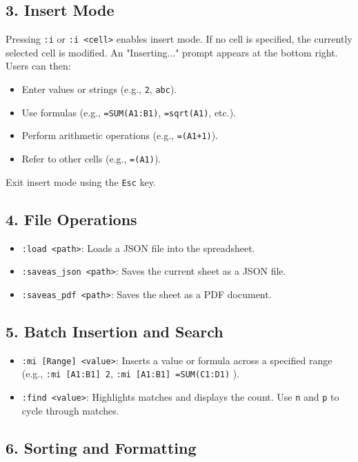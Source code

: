 \documentclass[a4paper,12pt]{article}
\begin{document}
\subsection*{3. Insert Mode}

Pressing \texttt{:i} or \texttt{:i <cell>} enables insert mode. If no cell is specified, the currently selected cell is modified. An "Inserting..." prompt appears at the bottom right. Users can then:
\begin{itemize}[label={}]
  \item Enter values or strings (e.g., \texttt{2}, \texttt{abc}).
  \item Use formulas (e.g., \texttt{=SUM(A1:B1)}, \texttt{=sqrt(A1)}, etc.).
  \item Perform arithmetic operations (e.g., \texttt{=(A1+1)}).
  \item Refer to other cells (e.g., \texttt{=(A1)}).
\end{itemize}
Exit insert mode using the \texttt{Esc} key.

\subsection*{4. File Operations}

\begin{itemize}[label={}]
  \item \texttt{:load <path>}: Loads a JSON file into the spreadsheet.
  \item \texttt{:saveas\_json <path>}: Saves the current sheet as a JSON file.
  \item \texttt{:saveas\_pdf <path>}: Saves the sheet as a PDF document.
\end{itemize}

\subsection*{5. Batch Insertion and Search}

\begin{itemize}[label={}]
  \item \texttt{:mi [Range] <value>}: Inserts a value or formula across a specified range (e.g., \texttt{:mi [A1:B1] 2}, \texttt{:mi [A1:B1] =SUM(C1:D1)} ).
  \item \texttt{:find <value>}: Highlights matches and displays the count. Use \texttt{n} and \texttt{p} to cycle through matches.
\end{itemize}

\subsection*{6. Sorting and Formatting}
\end{document}
